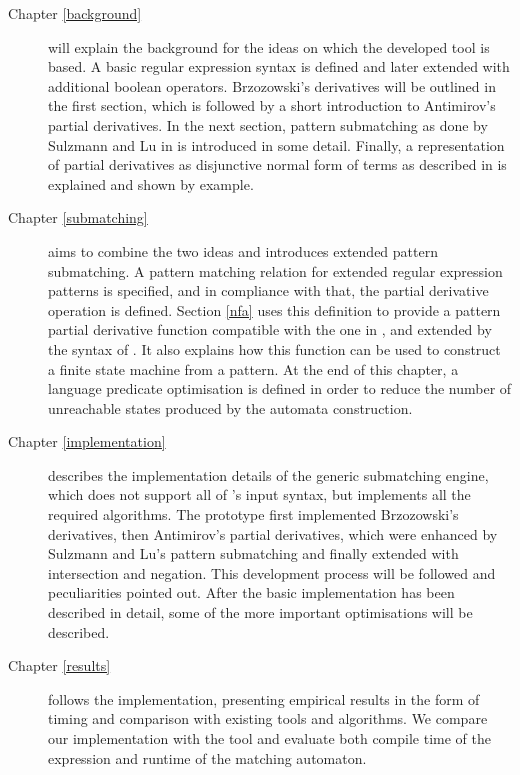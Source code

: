 \begin{description}

   \item[Chapter \ref{background}] will explain the background for the ideas on
      which the developed tool is based. A basic regular expression syntax is
      defined and later extended with additional boolean operators. Brzozowski's
      derivatives will be outlined in the first section, which is followed by a
      short introduction to Antimirov's partial derivatives. In the next
      section, pattern submatching as done by Sulzmann and Lu in \cite{pdpat} is
      introduced in some detail. Finally, a representation of partial
      derivatives as disjunctive normal form of terms as described in
      \cite{pdere} is explained and shown by example.

   \item[Chapter \ref{submatching}] aims to combine the two ideas and introduces
      extended pattern submatching. A pattern matching relation for extended
      regular expression patterns is specified, and in compliance with that, the
      partial derivative operation is defined. Section \ref{nfa} uses this
      definition to provide a pattern partial derivative function compatible
      with the one in \cite{pdpat}, and extended by the syntax of \cite{pdere}.
      It also explains how this function can be used to construct a finite state
      machine from a pattern. At the end of this chapter, a language predicate
      optimisation is defined in order to reduce the number of unreachable
      states produced by the automata construction.

   \item[Chapter \ref{implementation}] describes the implementation details of
      the generic submatching engine, which does not support all of \dreml's
      input syntax, but implements all the required algorithms. The prototype
      first implemented Brzozowski's derivatives, then Antimirov's partial
      derivatives, which were enhanced by Sulzmann and Lu's pattern submatching
      and finally extended with intersection and negation. This development
      process will be followed and peculiarities pointed out. After the basic
      implementation has been described in detail, some of the more important
      optimisations will be described.

   \item[Chapter \ref{results}] follows the implementation, presenting empirical
      results in the form of timing and comparison with existing tools and
      algorithms. We compare our implementation with the \mlulex{} tool and
      evaluate both compile time of the expression and runtime of the matching
      automaton.


\end{description}
